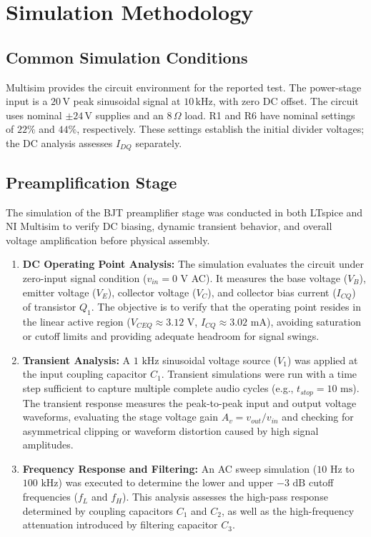 \documentclass[conference,letterpaper]{IEEEtran}
\newcommand{\Ohm}{\Omega}
\newcommand{\V}{\mathrm{V}}
\newcommand{\kHz}{\mathrm{kHz}}
\begin{document}
\section{Simulation Methodology}
\subsection{Common Simulation Conditions}

Multisim provides the circuit environment for the reported test.
The power-stage input is a $20\,\V$ peak sinusoidal signal at
$10\,\kHz$, with zero DC offset. The circuit uses nominal
$\pm24\,\V$ supplies and an $8\,\Ohm$ load. R1 and R6 have nominal settings
of $22\%$ and $44\%$, respectively. These settings establish the
initial divider voltages; the DC analysis assesses $I_{DQ}$ separately.

\subsection{Preamplification Stage}
The simulation of the BJT preamplifier stage was conducted in both LTspice and NI Multisim to verify DC biasing, dynamic transient behavior, and overall voltage amplification before physical assembly.

\begin{enumerate}
    \item \textbf{DC Operating Point Analysis:} The simulation evaluates the circuit under zero-input signal condition ($v_{in} = 0\text{~V}$ AC). It measures the base voltage ($V_B$), emitter voltage ($V_E$), collector voltage ($V_C$), and collector bias current ($I_{CQ}$) of transistor $Q_1$. The objective is to verify that the operating point resides in the linear active region ($V_{CEQ} \approx 3.12\text{~V}$, $I_{CQ} \approx 3.02\text{~mA}$), avoiding saturation or cutoff limits and providing adequate headroom for signal swings.

    \item \textbf{Transient Analysis:} A $1\text{~kHz}$ sinusoidal voltage source ($V_1$) was applied at the input coupling capacitor $C_1$. Transient simulations were run with a time step sufficient to capture multiple complete audio cycles (e.g., $t_{stop} = 10\text{~ms}$). The transient response measures the peak-to-peak input and output voltage waveforms, evaluating the stage voltage gain $A_v = v_{out} / v_{in}$ and checking for asymmetrical clipping or waveform distortion caused by high signal amplitudes.

    \item \textbf{Frequency Response and Filtering:} An AC sweep simulation ($10\text{~Hz}$ to $100\text{~kHz}$) was executed to determine the lower and upper $-3\text{~dB}$ cutoff frequencies ($f_L$ and $f_H$). This analysis assesses the high-pass response determined by coupling capacitors $C_1$ and $C_2$, as well as the high-frequency attenuation introduced by filtering capacitor $C_3$.
\end{enumerate}
\end{document}
